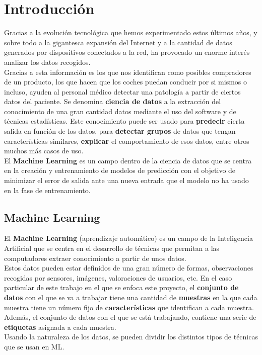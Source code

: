 \chapter{Introducción}
Gracias a la evolución tecnológica que hemos experimentado estos últimos años, y sobre todo a la gigantesca expansión del Internet y a la cantidad de datos generados por dispositivos conectados a la red, ha provocado un enorme interés analizar los datos recogidos.\\
Gracias a esta información es los que nos identifican como posibles compradores de un producto, los que hacen que los coches puedan conducir por si mismos o incluso, ayuden al personal médico detectar una patología a partir de ciertos datos del paciente.
\linebreak
Se denomina \textbf{ciencia de datos} a la extracción del conocimiento de una gran cantidad datos mediante el uso del software y de técnicas estadísticas. Este conocimiento puede ser usado para \textbf{predecir} cierta salida en función de los datos, para \textbf{detectar grupos} de datos que tengan características similares, \textbf{explicar} el comportamiento de esos datos, entre otros muchos más casos de uso. \\
\linebreak
El \textbf{Machine Learning} es un campo dentro de la ciencia de datos que se centra en la creación y entrenamiento de modelos de predicción con el objetivo de minimizar el error de salida ante una nueva entrada que el modelo no ha usado en la fase de entrenamiento.
\section{Machine Learning}
El \textbf{Machine Learning} (aprendizaje automático) es un campo de la Inteligencia Artificial que se centra en el desarrollo de técnicas que permitan a las computadores extraer conocimiento a partir de unos datos.\\
\linebreak
Estos datos pueden estar definidos de una gran número de formas, observaciones recogidas por sensores, imágenes, valoraciones de usuarios, etc. En el caso particular de este trabajo en el que se enfoca este proyecto, el \textbf{conjunto de datos} con el que se va a trabajar tiene una cantidad de \textbf{muestras} en la que cada muestra tiene un número fijo de \textbf{características} que identifican a cada muestra. Además, el conjunto de datos con el que se está trabajando, contiene una serie de \textbf{etiquetas} asignada a cada muestra.\\
\linebreak
Usando la naturaleza de los datos, se pueden dividir los distintos tipos de técnicas que se usan en ML.
